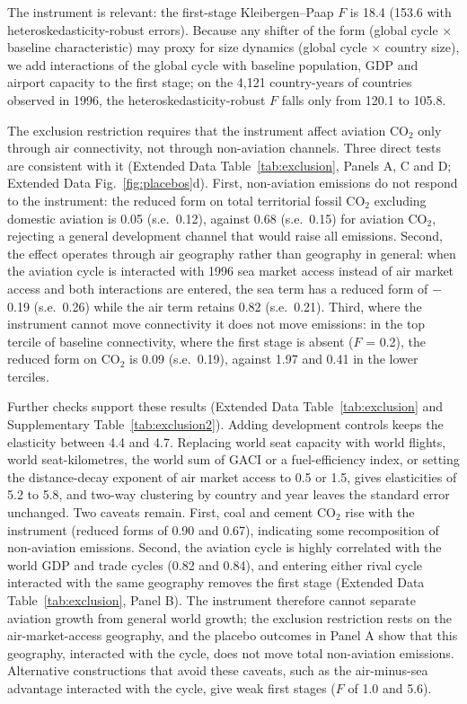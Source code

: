 \documentclass[12pt]{extarticle}
\begin{document}
The instrument is relevant: the first-stage Kleibergen--Paap $F$ is 18.4 (153.6 with heteroskedasticity-robust errors). Because any shifter of the form (global cycle $\times$ baseline characteristic) may proxy for size dynamics (global cycle $\times$ country size), we add interactions of the global cycle with baseline population, GDP and airport capacity to the first stage; on the 4,121 country-years of countries observed in 1996, the heteroskedasticity-robust $F$ falls only from 120.1 to 105.8.

The exclusion restriction requires that the instrument affect aviation CO$_2$ only through air connectivity, not through non-aviation channels. Three direct tests are consistent with it (Extended Data Table~\ref{tab:exclusion}, Panels A, C and D; Extended Data Fig.~\ref{fig:placebos}d). First, non-aviation emissions do not respond to the instrument: the reduced form on total territorial fossil CO$_2$ excluding domestic aviation is 0.05 (s.e.\ 0.12), against 0.68 (s.e.\ 0.15) for aviation CO$_2$, rejecting a general development channel that would raise all emissions. Second, the effect operates through air geography rather than geography in general: when the aviation cycle is interacted with 1996 sea market access instead of air market access and both interactions are entered, the sea term has a reduced form of $-$0.19 (s.e.\ 0.26) while the air term retains 0.82 (s.e.\ 0.21). Third, where the instrument cannot move connectivity it does not move emissions: in the top tercile of baseline connectivity, where the first stage is absent ($F$ = 0.2), the reduced form on CO$_2$ is 0.09 (s.e.\ 0.19), against 1.97 and 0.41 in the lower terciles.

Further checks support these results (Extended Data Table~\ref{tab:exclusion} and Supplementary Table~\ref{tab:exclusion2}). Adding development controls keeps the elasticity between 4.4 and 4.7. Replacing world seat capacity with world flights, world seat-kilometres, the world sum of GACI or a fuel-efficiency index, or setting the distance-decay exponent of air market access to 0.5 or 1.5, gives elasticities of 5.2 to 5.8, and two-way clustering by country and year leaves the standard error unchanged. Two caveats remain. First, coal and cement CO$_2$ rise with the instrument (reduced forms of 0.90 and 0.67), indicating some recomposition of non-aviation emissions. Second, the aviation cycle is highly correlated with the world GDP and trade cycles (0.82 and 0.84), and entering either rival cycle interacted with the same geography removes the first stage (Extended Data Table~\ref{tab:exclusion}, Panel B). The instrument therefore cannot separate aviation growth from general world growth; the exclusion restriction rests on the air-market-access geography, and the placebo outcomes in Panel A show that this geography, interacted with the cycle, does not move total non-aviation emissions. Alternative constructions that avoid these caveats, such as the air-minus-sea advantage interacted with the cycle, give weak first stages ($F$ of 1.0 and 5.6).
\end{document}
